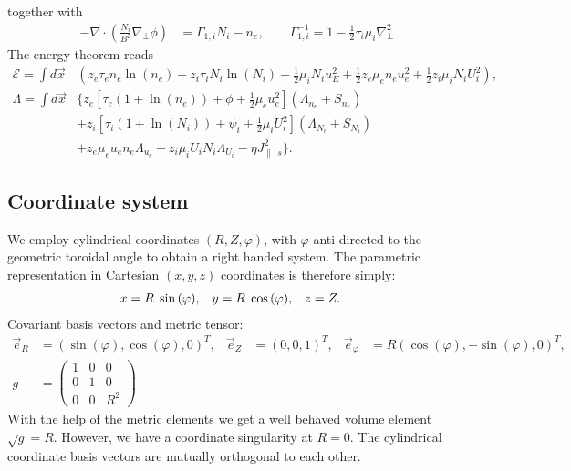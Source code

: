 together with
  \begin{align}
    -\nabla\cdot\left( \frac{N_i}{B^2}\nabla_\perp \phi \right) &= \Gamma_{1,i} N_i - n_e, \quad\quad
    \Gamma_{1,i}^{-1} = 1-\frac{1}{2}\tau_i\mu_i \nabla_\perp^2
  \end{align}
The energy theorem reads
\begin{align}
  \mathcal{E}= \int  d\vec{x} & \left( z_e\tau_e n_e \ln{(n_e)} +z_i\tau_i N_i\ln{(N_i)}+  \frac{1}{2} \mu_i N_i u_E^2 +\frac{1}{2} z_e\mu_e  n_e u_e^2 +\frac{1}{2} z_i\mu_i  N_i U_i^2  \right),\\
  \Lambda =  \int d\vec{x} & \bigg\{  z_e\left[\tau_e\left( 1+\ln{(n_e)}\right) + \phi + \frac{1}{2} \mu_e u_e^2 \right](\Lambda_{n_e} + S_{n_e})
  \nonumber\\ &
+z_i\left[\tau_i\left( 1+\ln{(N_i)}\right) + \psi_i + \frac{1}{2} \mu_i U_i^2 \right](\Lambda_{N_i}+S_{N_i})
\nonumber \\ &
+ z_e\mu_e u_e n_e \Lambda_{u_e}+z_i\mu_iU_i N_i \Lambda_{U_i} - \eta J_{\parallel,s}^2\bigg\}.
\end{align}

\subsection{Coordinate system}\label{sec:cylmetric}
We employ cylindrical coordinates \( (R,Z,\varphi) \), with \(\varphi\) anti directed to the geometric toroidal angle to
obtain a right handed system. The parametric representation in Cartesian \((x,y,z)\) coordinates is therefore simply:
\begin{align}
 x &= R \hspace{1 mm} \sin{(\varphi)}, &
 y &= R \hspace{1 mm} \cos{(\varphi)}, &
 z &= Z .
\end{align}
Covariant
basis vectors and metric tensor:
\begin{align}
 \vec{e}_R      &= (\sin{(\varphi)} ,   \cos{(\varphi)},0)^T, &
 \vec{e}_Z      &= ( 0 ,0 ,1 )^T, &
 \vec{e}_{\varphi} &= R ( \cos{(\varphi)} , -\sin{(\varphi)} , 0 )^T,
\\
 g &= \begin{pmatrix}
  1 & 0 & 0 \\
  0 & 1 & 0 \\
  0 & 0 & R^2
   \end{pmatrix}
\end{align}
With the help of the metric elements we get a well behaved volume element \(\sqrt{g} = R\). However, we have a coordinate singularity at \(R=0\).
The cylindrical coordinate basis vectors are mutually orthogonal to each other.
